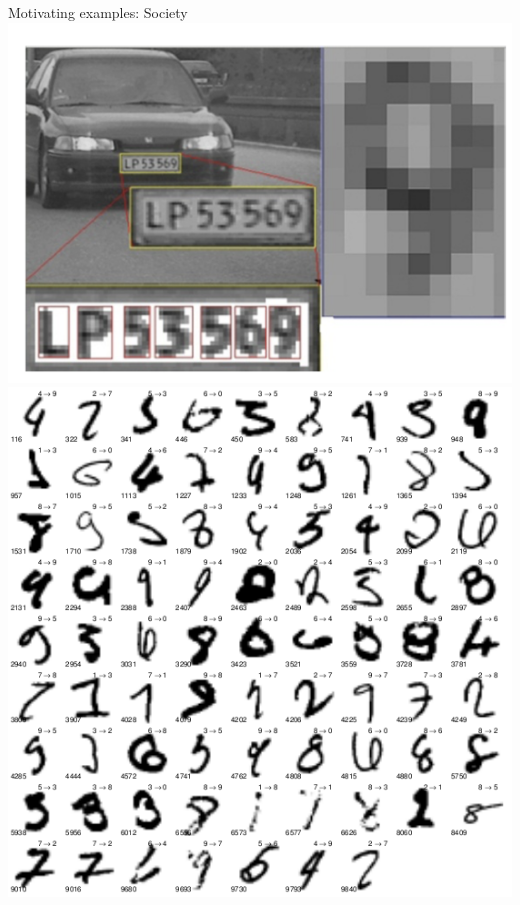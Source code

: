 \documentclass[mathserif, aspectratio=169]{beamer}
\begin{document}
\begin{frame}{Motivating examples: Society}
\includegraphics[scale=0.45]{thome_character}%
\hspace{20mm}\includegraphics[scale=0.18]{malik_2009_handwriting}

\end{frame}
\end{document}
